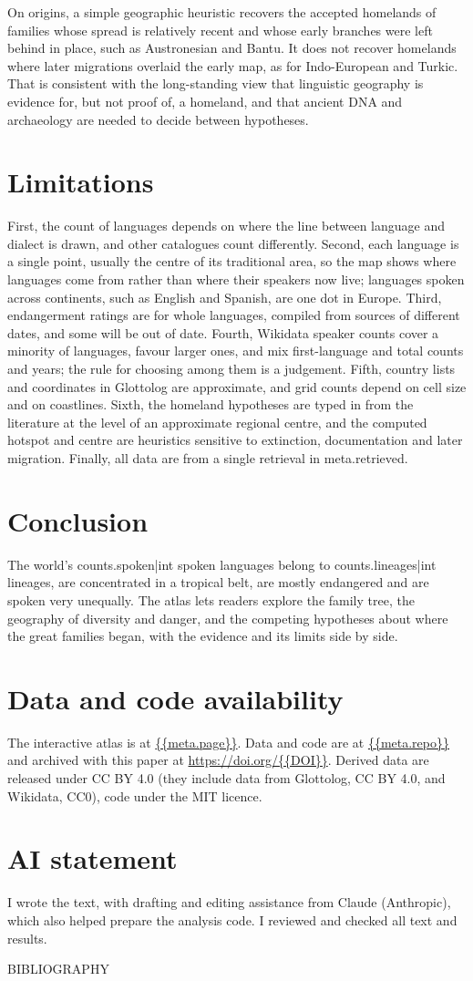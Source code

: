 \documentclass[11pt,a4paper]{article}
\begin{document}
On origins, a simple geographic heuristic recovers the accepted homelands of families whose spread is relatively recent and whose early branches were left behind in place, such as Austronesian and Bantu. It does not recover homelands where later migrations overlaid the early map, as for Indo-European and Turkic. That is consistent with the long-standing view that linguistic geography is evidence for, but not proof of, a homeland, and that ancient DNA and archaeology are needed to decide between hypotheses.

\section{Limitations}
First, the count of languages depends on where the line between language and dialect is drawn, and other catalogues count differently. Second, each language is a single point, usually the centre of its traditional area, so the map shows where languages come from rather than where their speakers now live; languages spoken across continents, such as English and Spanish, are one dot in Europe. Third, endangerment ratings are for whole languages, compiled from sources of different dates, and some will be out of date. Fourth, Wikidata speaker counts cover a minority of languages, favour larger ones, and mix first-language and total counts and years; the rule for choosing among them is a judgement. Fifth, country lists and coordinates in Glottolog are approximate, and grid counts depend on cell size and on coastlines. Sixth, the homeland hypotheses are typed in from the literature at the level of an approximate regional centre, and the computed hotspot and centre are heuristics sensitive to extinction, documentation and later migration. Finally, all data are from a single retrieval in {{meta.retrieved}}.

\section{Conclusion}
The world's {{counts.spoken|int}} spoken languages belong to {{counts.lineages|int}} lineages, are concentrated in a tropical belt, are mostly endangered and are spoken very unequally. The atlas lets readers explore the family tree, the geography of diversity and danger, and the competing hypotheses about where the great families began, with the evidence and its limits side by side.

\section*{Data and code availability}
The interactive atlas is at \url{{{meta.page}}}. Data and code are at \url{{{meta.repo}}} and archived with this paper at \url{https://doi.org/{{DOI}}}. Derived data are released under CC BY 4.0 (they include data from Glottolog, CC BY 4.0, and Wikidata, CC0), code under the MIT licence.

\section*{AI statement}
I wrote the text, with drafting and editing assistance from Claude (Anthropic), which also helped prepare the analysis code. I reviewed and checked all text and results.

{{BIBLIOGRAPHY}}
\end{document}
